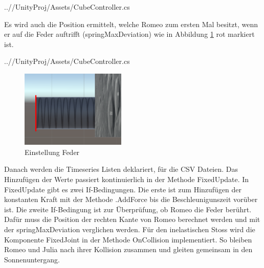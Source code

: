 \documentclass[../main.tex]{subfiles}
\begin{document}
    \begin{lstinputlisting}[label={lst:graphInelastic}, firstline=49, lastline=50]
    {..//UnityProj/Assets/CubeController.cs}
    \end{lstinputlisting}
    Es wird auch die Position ermittelt, welche Romeo zum ersten Mal besitzt, wenn er auf die Feder auftrifft (springMaxDeviation) wie in Abbildung \ref{fig:2Lab_SpringDeviation} rot markiert ist.
    \begin{lstinputlisting}[label={lst:graphInelastic}, firstline=51, lastline=52]
    {..//UnityProj/Assets/CubeController.cs}
    \end{lstinputlisting}


    \begin{figure}[H]
        \begin{center}
            \centerline{\includegraphics[width=50mm]{./images/2Lab_SpringDeviation.PNG}}
            \caption{Einstellung Feder}
            \label{fig:2Lab_SpringDeviation}
        \end{center}
    \end{figure}
    Danach werden die Timeseries Listen deklariert, für die CSV Dateien. Das Hinzufügen der Werte passiert kontinuierlich in der Methode FixedUpdate.
    \newline
    In FixedUpdate gibt es zwei If-Bedingungen. Die erste ist zum Hinzufügen der konstanten Kraft mit der Methode .AddForce bis die Beschleunigunszeit vorüber ist.
    Die zweite If-Bedingung ist zur Überprüfung, ob Romeo die Feder berührt. Dafür muss die Position der rechten Kante von Romeo berechnet werden und mit der
    springMaxDeviation verglichen werden.
    Für den inelastischen Stoss wird die Komponente FixedJoint in der Methode OnCollision implementiert. So bleiben Romeo und Julia  nach ihrer
    Kollision zusammen und gleiten gemeinsam in den Sonnenuntergang.
\end{document}
